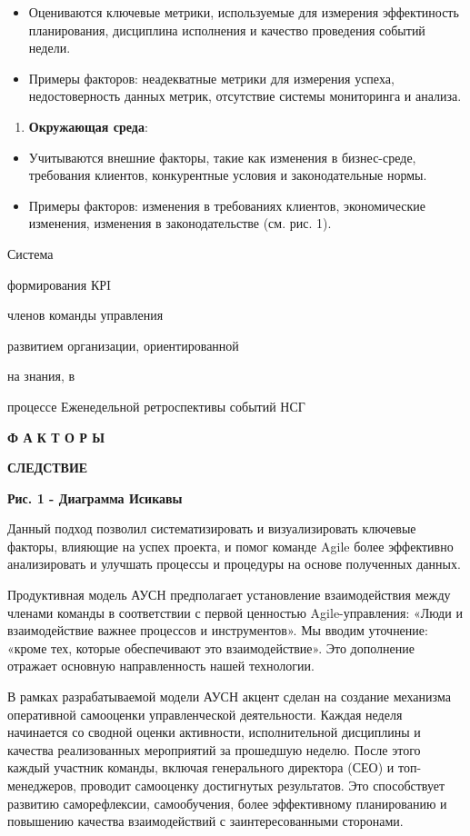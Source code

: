 \begin{itemize}
\item
  Оцениваются ключевые метрики, используемые для измерения эффектиность
  планирования, дисциплина исполнения и качество проведения событий
  недели.
\item
  Примеры факторов: неадекватные метрики для измерения успеха,
  недостоверность данных метрик, отсутствие системы мониторинга и
  анализа.
\end{itemize}

\begin{enumerate}
\def\labelenumi{\arabic{enumi}.}
\setcounter{enumi}{5}
\item
  {\bfseries Окружающая среда}:
\end{enumerate}

\begin{itemize}
\item
  Учитываются внешние факторы, такие как изменения в бизнес-среде,
  требования клиентов, конкурентные условия и законодательные нормы.
\item
  Примеры факторов: изменения в требованиях клиентов, экономические
  изменения, изменения в законодательстве (см. рис. 1).
\end{itemize}

Система

формирования КРI

членов команды управления

развитием организации, ориентированной

на знания, в

процессе Еженедельной ретроспективы событий НСГ

{\bfseries Ф А К Т О Р Ы}

{\bfseries СЛЕДСТВИЕ}

{\bfseries Рис. 1 - Диаграмма Исикавы}

Данный подход позволил систематизировать и визуализировать ключевые
факторы, влияющие на успех проекта, и помог команде Agile более
эффективно анализировать и улучшать процессы и процедуры на основе
полученных данных.

Продуктивная модель АУСН предполагает установление взаимодействия между
членами команды в соответствии с первой ценностью Agile-управления:
«Люди и взаимодействие важнее процессов и инструментов». Мы вводим
уточнение: «кроме тех, которые обеспечивают это взаимодействие». Это
дополнение отражает основную направленность нашей технологии.

В рамках разрабатываемой модели АУСН акцент сделан на создание механизма
оперативной самооценки управленческой деятельности. Каждая неделя
начинается со сводной оценки активности, исполнительной дисциплины и
качества реализованных мероприятий за прошедшую неделю. После этого
каждый участник команды, включая генерального директора (СЕО) и
топ-менеджеров, проводит самооценку достигнутых результатов. Это
способствует развитию саморефлексии, самообучения, более эффективному
планированию и повышению качества взаимодействий с заинтересованными
сторонами.

